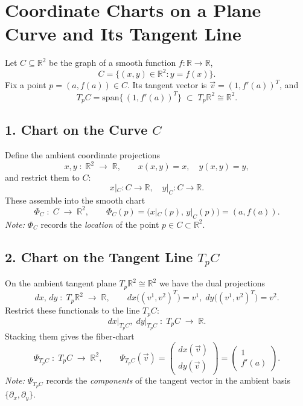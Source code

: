 \documentclass[12pt]{article}
\begin{document}
	
	\section*{Coordinate Charts on a Plane Curve and Its Tangent Line}
	
	Let \(C\subseteq\mathbb{R}^2\) be the graph of a smooth function \(f\colon\mathbb{R}\to\mathbb{R}\),
	\[
	C=\bigl\{(x,y)\in\mathbb{R}^2:y=f(x)\bigr\}.
	\]
	Fix a point \(p=(a,f(a))\in C\).  Its tangent vector is 
	\(\displaystyle\vec v=(1,f'(a))^T\), and 
	\[
	T_pC=\mathrm{span}\{\,(1,f'(a))^T\}\;\subset\;T_p\mathbb{R}^2\cong\mathbb{R}^2.
	\]
	
	\subsection*{1. Chart on the Curve \(C\)}
	Define the ambient coordinate projections
	\[
	x,y\;\colon\;\mathbb{R}^2\;\longrightarrow\;\mathbb{R},
	\qquad
	x(x,y)=x,\quad y(x,y)=y,
	\]
	and restrict them to \(C\):
	\[
	x|_C\colon C\to\mathbb{R}, 
	\quad 
	y|_C\colon C\to\mathbb{R}.
	\]
	These assemble into the smooth chart
	\[
	\Phi_C\;:\;C\;\longrightarrow\;\mathbb{R}^2,
	\qquad
	\Phi_C(p)
	=\bigl(x|_C(p),\,y|_C(p)\bigr)
	=(a,f(a)).
	\]
	\emph{Note:} \(\Phi_C\) records the \emph{location} of the point \(p\in C\subset\mathbb{R}^2\).
	
	\subsection*{2. Chart on the Tangent Line \(T_pC\)}
	On the ambient tangent plane \(T_p\mathbb{R}^2\cong\mathbb{R}^2\) we have the dual projections
	\[
	dx,\,dy\;\colon\;T_p\mathbb{R}^2\;\longrightarrow\;\mathbb{R},
	\qquad
	dx\bigl((v^1,v^2)^T\bigr)=v^1,\;
	dy\bigl((v^1,v^2)^T\bigr)=v^2.
	\]
	Restrict these functionals to the line \(T_pC\):
	\[
	dx\big|_{T_pC},\;dy\big|_{T_pC}
	\;\colon\;T_pC\;\longrightarrow\;\mathbb{R}.
	\]
	Stacking them gives the fiber‐chart
	\[
	\Psi_{T_pC}\;:\;T_pC\;\longrightarrow\;\mathbb{R}^2,
	\qquad
	\Psi_{T_pC}(\vec v)
	=\begin{pmatrix}
		dx(\vec v)\\[4pt]
		dy(\vec v)
	\end{pmatrix}
	=\begin{pmatrix}
		1\\[3pt]
		f'(a)
	\end{pmatrix}.
	\]
	\emph{Note:} \(\Psi_{T_pC}\) records the \emph{components} of the tangent vector in the
	ambient basis \(\{\partial_x,\partial_y\}\).
	
\end{document}
